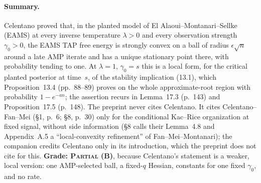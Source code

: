 \documentclass[11pt]{article}
\newcommand{\ploc}[2]{#1}
\newcommand{\sloc}[2]{\cite[#2]{#1}}
\newcommand{\grade}[1]{\textsc{#1}}
\begin{document}
\paragraph{Summary.}
Celentano
\sloc{Celentano2022-SudakovFerniquePostAMPTAPConvexity}{Thm.~2(i)(2) and~(ii), pp.~10--11}
proved that, in the planted model of El Alaoui--Montanari--Sellke (EAMS) at
every inverse temperature $\lambda>0$ and every observation strength
$\gamma_0>0$, the EAMS TAP free energy is strongly convex on a ball of radius
$\epsilon\sqrt n$ around a late AMP iterate and has a unique stationary point
there, with probability tending to one. At $\lambda=1$, $\gamma_0=s$ this is
a local form, for the critical planted posterior at time~$s$, of the stability
implication \ploc{(13.1)}{profile-positive.tex:16--30}, which
\ploc{Proposition~13.4 (pp.~88--89)}{profile-positive.tex:442--466} proves on
the whole approximate-root region with probability $1-e^{-an}$; the assertion
recurs in \ploc{Lemma~17.3 (p.~143)}{cap-classical.tex:298--314} and
\ploc{Proposition~17.5 (p.~148)}{cap-classical.tex:643--688}. The preprint
never cites Celentano. It cites Celentano--Fan--Mei
\ploc{(\S1, p.~6; \S8, p.~30)}{introduction.tex:218--223; profile-roots.tex:10--13}
only for the conditional Kac--Rice organization at fixed signal, without side
information (\S8 calls their Lemma~4.8 and Appendix~A.5 a
``local-convexity refinement'' of Fan--Mei--Montanari); the companion
\cite{OAI-AcceptedGap} credits Celentano only in its introduction, which the
preprint does not cite for this. \textbf{Grade: \grade{Partial} (B)}, because
Celentano's statement is a weaker, local version: one AMP-selected ball, a
fixed-$q$ Hessian, constants for one fixed $\gamma_0$, and no rate.
\end{document}

